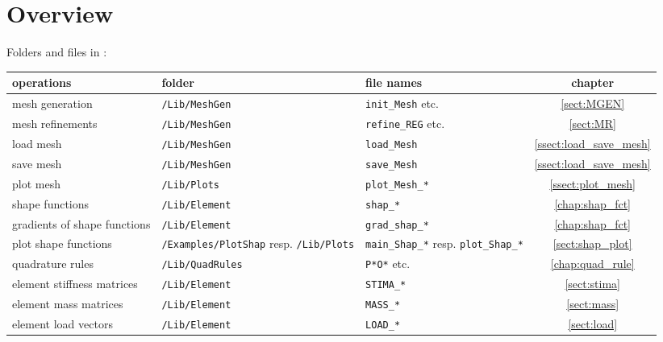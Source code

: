 
\chapter*{Overview} \label{chap:overview}

Folders and files in \LIBNAME: \\

\begin{tabular}{p{4cm}|p{3.3cm}|p{2.9cm}|c}
	operations & folder & file names & chapter \\ \hline

	mesh generation & {\tt /Lib/MeshGen} & {\tt init\_Mesh} etc. & \ref{sect:MGEN}\\
	mesh refinements & {\tt /Lib/MeshGen} & {\tt refine\_REG} etc. & \ref{sect:MR} \\
	load mesh & {\tt /Lib/MeshGen} & {\tt load\_Mesh} & \ref{ssect:load_save_mesh} \\
	save mesh & {\tt /Lib/MeshGen} & {\tt save\_Mesh} & \ref{ssect:load_save_mesh} \\
	plot mesh & {\tt /Lib/Plots} & {\tt plot\_Mesh\_*} & \ref{ssect:plot_mesh} \\ \hline

	shape functions & {\tt /Lib/Element} & {\tt shap\_*} & \ref{chap:shap_fct} \\
	gradients of shape functions & 	{\tt /Lib/Element} & {\tt grad\_shap\_*} & \ref{chap:shap_fct} \\ 
	plot shape functions & {\tt /Examples/PlotShap} resp. {\tt /Lib/Plots} & {\tt main\_Shap\_*} resp. {\tt plot\_Shap\_*} & \ref{sect:shap_plot} \\ \hline

	quadrature rules & {\tt /Lib/QuadRules} & {\tt P*O*} etc. & \ref{chap:quad_rule} \\ \hline

	element stiffness matrices & {\tt /Lib/Element} & {\tt STIMA\_*} & \ref{sect:stima} \\
	element mass matrices & {\tt /Lib/Element} & {\tt MASS\_*} & \ref{sect:mass} \\
	element load vectors & {\tt /Lib/Element} & {\tt LOAD\_*} & \ref{sect:load} \\ \hline


\end{tabular}
